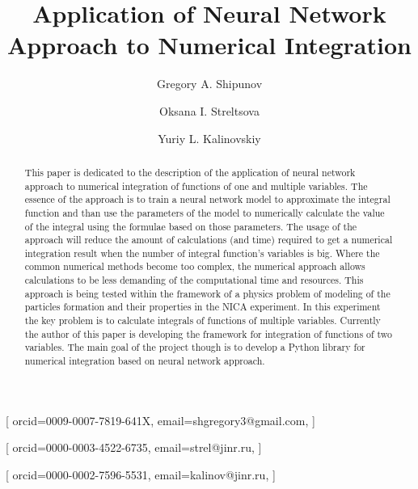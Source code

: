 \documentclass[%
]{ittmm}
\begin{document}


\title{Application of Neural Network Approach to Numerical Integration}

\author[1]{Gregory A. Shipunov}[%
orcid=0009-0007-7819-641X,
email=shgregory3@gmail.com,
]
\cormark[1]

\author[1,2]{Oksana I. Streltsova}[%
orcid=0000-0003-4522-6735,
email=strel@jinr.ru,
]

\author[1,2]{Yuriy L. Kalinovskiy}[%
orcid=0000-0002-7596-5531,
email=kalinov@jinr.ru,
]
\address[1]{Dubna State University,
  19 Universitetskaya St, Dubna, 141980, Russian Federation}
\address[2]{Joint Institute for Nuclear Research,
  6 Joliot-Curie St, Dubna, 141980, Russian Federation}


\begin{abstract}
    This paper is dedicated to the description of the application of neural network approach to numerical integration of functions of one and multiple variables. The essence of the approach is to train a neural network model to approximate the integral function and than use the parameters of the model to numerically calculate the value of the integral using the formulae based on those parameters. The usage of the approach will reduce the amount of calculations (and time) required to get a numerical integration result when the number of integral function's variables is big. Where the common numerical methods become too complex, the numerical approach allows calculations to be less demanding of the computational time and resources. This approach is being tested within the framework of a physics problem of modeling of the particles formation and their properties in the NICA experiment. In this experiment the key problem is to calculate integrals of functions of multiple variables. Currently the author of this paper is developing the framework for integration of functions of two variables. The main goal of the project though is to develop a Python library for numerical integration based on neural network approach.

\end{abstract}
\end{document}
